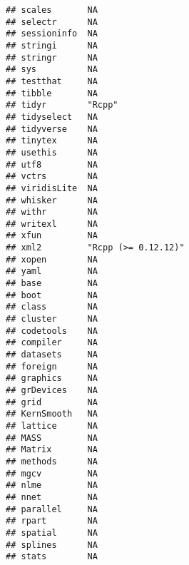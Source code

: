 \documentclass[]{book}
\begin{document}
\begin{verbatim}
## scales       NA                                     
## selectr      NA                                     
## sessioninfo  NA                                     
## stringi      NA                                     
## stringr      NA                                     
## sys          NA                                     
## testthat     NA                                     
## tibble       NA                                     
## tidyr        "Rcpp"                                 
## tidyselect   NA                                     
## tidyverse    NA                                     
## tinytex      NA                                     
## usethis      NA                                     
## utf8         NA                                     
## vctrs        NA                                     
## viridisLite  NA                                     
## whisker      NA                                     
## withr        NA                                     
## writexl      NA                                     
## xfun         NA                                     
## xml2         "Rcpp (>= 0.12.12)"                    
## xopen        NA                                     
## yaml         NA                                     
## base         NA                                     
## boot         NA                                     
## class        NA                                     
## cluster      NA                                     
## codetools    NA                                     
## compiler     NA                                     
## datasets     NA                                     
## foreign      NA                                     
## graphics     NA                                     
## grDevices    NA                                     
## grid         NA                                     
## KernSmooth   NA                                     
## lattice      NA                                     
## MASS         NA                                     
## Matrix       NA                                     
## methods      NA                                     
## mgcv         NA                                     
## nlme         NA                                     
## nnet         NA                                     
## parallel     NA                                     
## rpart        NA                                     
## spatial      NA                                     
## splines      NA                                     
## stats        NA                                     

\end{verbatim}
\end{document}
